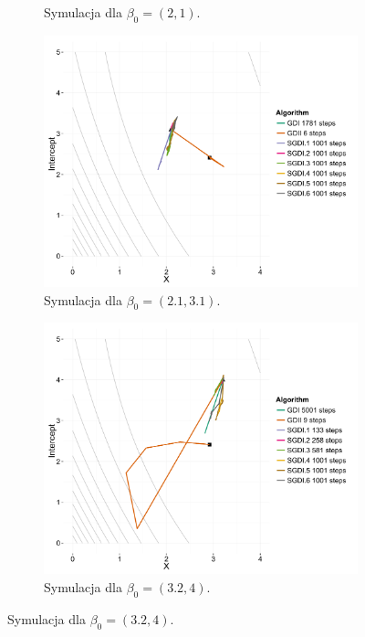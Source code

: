 \begin{figure}[h!]
\begin{center}
\begin{subfigure}[h!]{0.45\textwidth}
        \caption{Symulacja dla $\beta_0 = (2,1)$.}
      \end{subfigure}
   \begin{subfigure}[h!]{0.45\textwidth}
           \includegraphics[width=\textwidth]{Obrazki/contour_21_31.pdf}
           \caption{Symulacja dla $\beta_0 = (2.1,3.1)$.}
                 \end{subfigure}
   \begin{subfigure}[h!]{0.45\textwidth}
              \includegraphics[width=\textwidth]{Obrazki/contour_32_4.pdf}
              \caption{Symulacja dla $\beta_0 = (3.2,4)$.}

\end{subfigure}
\end{center}
\end{figure}
